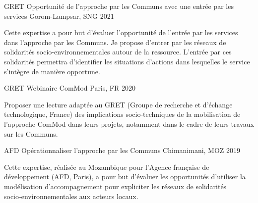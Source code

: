

\begin{cventries}

  \cventry
    {GRET} %
    {Opportunité de l’approche par les Communs avec une entrée par les services} %
    {Gorom-Lampsar, SNG} %
    {2021} %
    {
      \begin{cvitems} %
        Cette expertise a pour but d’évaluer l’opportunité de l’entrée par les services dans l’approche par les Communs. Je propose d’entrer par les réseaux de solidarités socio‑environnementales autour de la ressource. L’entrée par ces solidarités permettra d’identifier les situations d’actions dans lesquelles le service s’intègre de manière opportune.
      \end{cvitems}
    }

\cventry
  {GRET} %
  {Webinaire ComMod} %
  {Paris, FR} %
  {2020} %
  {
    \begin{cvitems} %
      Proposer une lecture adaptée au GRET (Groupe de recherche et d’échange technologique, France) des implications socio‑techniques de la mobilisation de l’approche ComMod dans leurs projets, notamment dans le cadre de leurs travaux sur les Communs.
    \end{cvitems}
  }
    \cventry
      {AFD} %
      {Opérationnaliser l’approche par les Communs} %
      {Chimanimani, MOZ} %
      {2019} %
      {
        \begin{cvitems} %
          Cette expertise, réalisée au Mozambique pour l'Agence française de développement (AFD, Paris), a pour but d'évaluer les opportunités d’utiliser la modélisation d’accompagnement pour expliciter les réseaux de solidarités socio‑environnementales aux acteurs locaux.
        \end{cvitems}
      }


\end{cventries}
